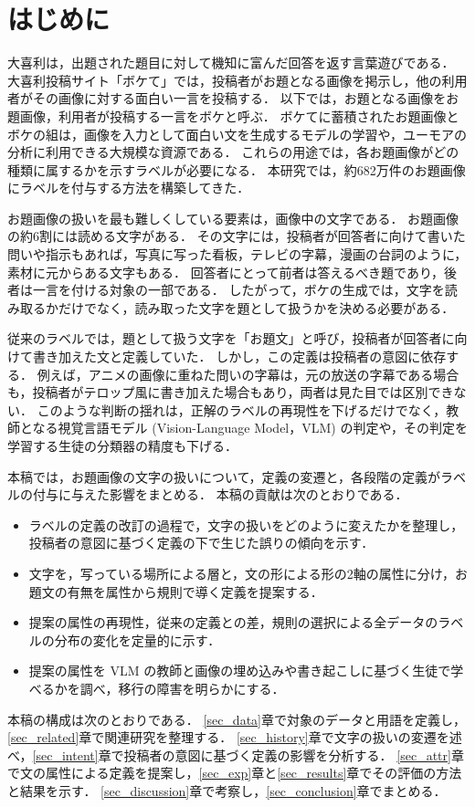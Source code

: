 \section{はじめに}
\label{sec_intro}
大喜利は，出題された題目に対して機知に富んだ回答を返す言葉遊びである．
大喜利投稿サイト「ボケて」\cite{ref_bokete}では，投稿者がお題となる画像を掲示し，他の利用者がその画像に対する面白い一言を投稿する．
以下では，お題となる画像をお題画像，利用者が投稿する一言をボケと呼ぶ．
ボケてに蓄積されたお題画像とボケの組は，画像を入力として面白い文を生成するモデルの学習や，ユーモアの分析に利用できる大規模な資源である．
これらの用途では，各お題画像がどの種類に属するかを示すラベルが必要になる．
本研究では，約682万件のお題画像にラベルを付与する方法を構築してきた．

お題画像の扱いを最も難しくしている要素は，画像中の文字である．
お題画像の約6割には読める文字がある．
その文字には，投稿者が回答者に向けて書いた問いや指示もあれば，写真に写った看板，テレビの字幕，漫画の台詞のように，素材に元からある文字もある．
回答者にとって前者は答えるべき題であり，後者は一言を付ける対象の一部である．
したがって，ボケの生成では，文字を読み取るかだけでなく，読み取った文字を題として扱うかを決める必要がある．

従来のラベルでは，題として扱う文字を「お題文」と呼び，投稿者が回答者に向けて書き加えた文と定義していた．
しかし，この定義は投稿者の意図に依存する．
例えば，アニメの画像に重ねた問いの字幕は，元の放送の字幕である場合も，投稿者がテロップ風に書き加えた場合もあり，両者は見た目では区別できない．
このような判断の揺れは，正解のラベルの再現性を下げるだけでなく，教師となる視覚言語モデル (Vision-Language Model，VLM) の判定や，その判定を学習する生徒の分類器の精度も下げる．

本稿では，お題画像の文字の扱いについて，定義の変遷と，各段階の定義がラベルの付与に与えた影響をまとめる．
本稿の貢献は次のとおりである．
\begin{itemize}
    \item ラベルの定義の改訂の過程で，文字の扱いをどのように変えたかを整理し，投稿者の意図に基づく定義の下で生じた誤りの傾向を示す．
    \item 文字を，写っている場所による層と，文の形による形の2軸の属性に分け，お題文の有無を属性から規則で導く定義を提案する．
    \item 提案の属性の再現性，従来の定義との差，規則の選択による全データのラベルの分布の変化を定量的に示す．
    \item 提案の属性を VLM の教師と画像の埋め込みや書き起こしに基づく生徒で学べるかを調べ，移行の障害を明らかにする．
\end{itemize}

本稿の構成は次のとおりである．
\ref{sec_data}章で対象のデータと用語を定義し，\ref{sec_related}章で関連研究を整理する．
\ref{sec_history}章で文字の扱いの変遷を述べ，\ref{sec_intent}章で投稿者の意図に基づく定義の影響を分析する．
\ref{sec_attr}章で文の属性による定義を提案し，\ref{sec_exp}章と\ref{sec_results}章でその評価の方法と結果を示す．
\ref{sec_discussion}章で考察し，\ref{sec_conclusion}章でまとめる．
